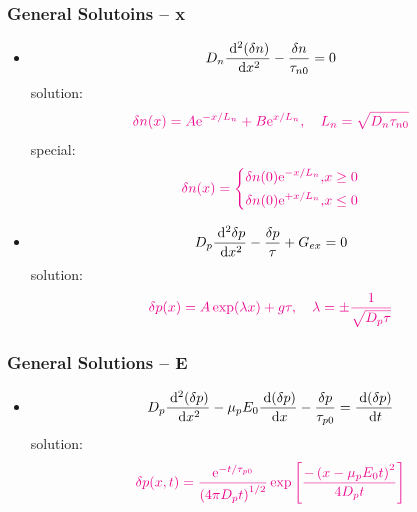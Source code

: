 \documentclass{beamer}
\begin{document}
    \begin{frame} \frametitle{General Solutoins -- x}
        \begin{itemize}
            \item \begin{equation*}
                    D_n \frac{\: \mathrm{d} ^2 (\delta n)}{\: \mathrm{d} x^2} - \frac{\delta n}{\tau_{n0}} = 0
                \end{equation*}
                solution:
                \begin{equation*}
                    \color{magenta}
                    \delta n(x) = A \mathrm{e}^{- x/L_n} + B \mathrm{e}^{x/L_n}, \quad L_n = \sqrt{D_n \tau_{n0}}
                \end{equation*}
                special:
                \begin{equation*}
                    \color{magenta}
                    \delta n(x) = 
                    \left\{
                        \begin{aligned}
                            \delta n(0) \mathrm{e}^{-x / L_n}, &x \ge 0 \\
                            \delta n(0) \mathrm{e}^{+x/L_n}, &x \le 0
                        \end{aligned}
                    \right.
                \end{equation*}

            \item \begin{equation*}
                    D_p \frac{\: \mathrm{d} ^2 \delta p}{\: \mathrm{d} x^2} - \frac{\delta p}{\tau} + G_{ex} = 0
                \end{equation*}
                solution:
                \begin{equation*}
                    \color{magenta}
                    \delta p(x) = A \exp(\lambda x) + g \tau, \quad \lambda = \pm \frac{1}{\sqrt{D_p \tau}} 
                \end{equation*}
        \end{itemize}
    \end{frame}

    \begin{frame} \frametitle{General Solutions -- E}
        \begin{itemize}
            \item \begin{equation*}
                    D_p \frac{\: \mathrm{d}^2 (\delta p)}{\: \mathrm{d} x^2} - \mu_p E_0 \frac{\: \mathrm{d} (\delta p)}{\: \mathrm{d} x} - \frac{\delta p}{\tau_{p0}} = \frac{\: \mathrm{d} (\delta p)}{\: \mathrm{d} t}  
                \end{equation*}
                solution:
                \begin{equation*}
                    \color{magenta}
                    \delta p(x, t) = \frac{\mathrm{e}^{-t/\tau_{p0}} }{\left( 4 \pi D_p t \right)^{1/2}} \exp\left[ \frac{-\left(x - \mu_p E_0 t\right)^2}{4 D_p t}  \right]
                \end{equation*}
        \end{itemize}
    \end{frame}
\end{document}
